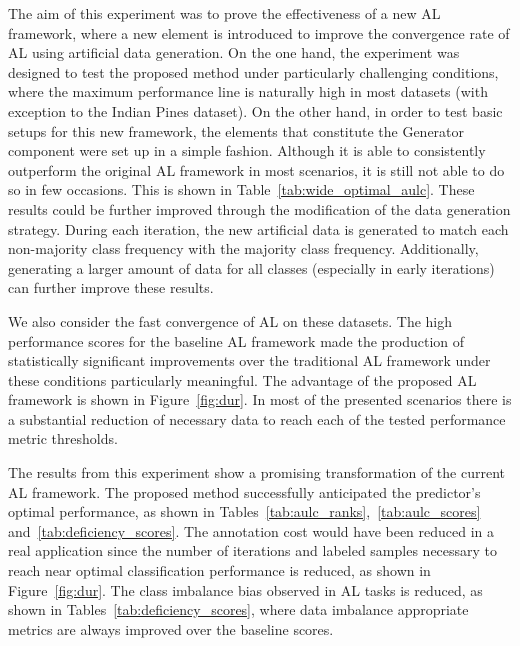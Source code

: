 \documentclass[parskip=full]{scrartcl}
\begin{document}
The aim of this experiment was to prove the effectiveness of a new AL framework,
where a new element is introduced to improve the convergence rate of AL using
artificial data generation. On the one hand, the experiment was designed to test
the proposed method under particularly challenging conditions, where the maximum
performance line is naturally high in most datasets (with exception to the
Indian Pines dataset). On the other hand, in order to test basic setups for this
new framework, the elements that constitute the Generator component were set up
in a simple fashion. Although it is able to consistently outperform the original
AL framework in most scenarios, it is still not able to do so in few occasions.
This is shown in Table~\ref{tab:wide_optimal_aulc}. These results could be
further improved through the modification of the data generation strategy.
During each iteration, the new artificial data is generated to match each
non-majority class frequency with the majority class frequency. Additionally,
generating a larger amount of data for all classes (especially in early
iterations) can further improve these results. 

We also consider the fast convergence of AL on these datasets. The high
performance scores for the baseline AL framework made the production of
statistically significant improvements over the traditional AL framework under
these conditions particularly meaningful. The advantage of the proposed AL
framework is shown in Figure~\ref{fig:dur}. In most of the presented scenarios
there is a substantial reduction of necessary data to reach each of the tested
performance metric thresholds. 

The results from this experiment show a promising transformation of the current
AL framework. The proposed method successfully anticipated the predictor's
optimal performance, as shown in
Tables~\ref{tab:aulc_ranks},~\ref{tab:aulc_scores}
and~\ref{tab:deficiency_scores}. The annotation cost would have been reduced in
a real application since the number of iterations and labeled samples necessary
to reach near optimal classification performance is reduced, as shown in
Figure~\ref{fig:dur}. The class imbalance bias observed in AL tasks is reduced,
as shown in Tables~\ref{tab:deficiency_scores}, where data imbalance appropriate
metrics are always improved over the baseline scores.



\end{document}
